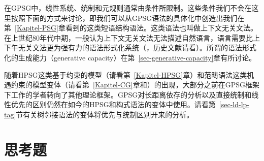 在GPSG中，线性系统、统制和元规则通常由条件所限制。这些条件我们不会在这里按照下面的方式来讨论，即我们可以从GPSG语法的具体化中创造出我们在第~\ref{Kapitel-PSG}章看到的这类短语结构语法。这类语法也叫做上下文无关文法。在上世纪80年代中期，一般认为上下文无关文法无法描述自然语言，语言需要比上下午无关文法更为强有力的语法形式化系统（\citealp{Shieber85a,Culy85a}，历史文献请看）。所谓的语法形式化的生成能力（generative capacity）在第~\ref{sec-generative-capacity}章有所讨论。

随着HPSG这类基于约束的模型（请看第~\ref{Kapitel-HPSG}章）和范畴语法这类机遇约束的模型变体（请看第~\ref{Kapitel-CG}章和\citealp{Uszkoreit86d}）的出现，大部分之前在GPSG框架下工作的学者转向了其他理论框架。GPSG对长距离依存的分析以及直接统制和线性优先的区别仍然在如今的HPSG\indexhpsg 和构式语法\indexcxg 的变体中使用。请看第~\ref{sec-ld-lp-tag}节有关树邻接语法的变体将优先与统制区别开来的分析。

\section*{思考题}

